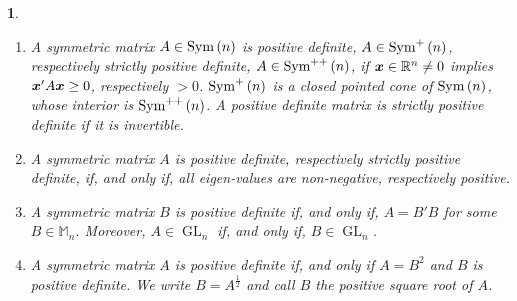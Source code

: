\documentclass[12pt,a4paper]{amsart}
\theoremstyle{plain}%
\newtheorem{npar}{}%
\theoremstyle{definition}
\theoremstyle{remark}
\begin{document}
\begin{npar}
\begin{enumerate}
  \item A symmetric matrix $A \in \operatorname{Sym}\left(n\right)$ is positive definite, $A \in \operatorname{Sym}^{+}\left(n\right)$, respectively strictly positive definite, $A \in \operatorname{Sym}^{++}\left(n\right)$, if $\bm x \in \mathbb{R}^n \ne 0$ implies $\bm x' A \bm x \ge 0$, respectively $>0$. $\operatorname{Sym}^{+}\left(n\right)$ is a closed pointed cone of $\operatorname{Sym}\left(n\right)$, whose interior is $\operatorname{Sym}^{++}\left(n\right)$. A positive definite matrix is strictly positive definite if it is invertible.
\item A symmetric matrix $A$ is positive definite, respectively strictly positive definite,  if, and only if, all eigen-values are non-negative, respectively positive.
\item A symmetric matrix $B$ is positive definite if, and only if, $A = B'B$ for some $B \in \mathbb M_n$. Moreover, $A\in \operatorname{GL}_n$ if, and only if, $B\in \operatorname{GL}_n$.
\item A symmetric matrix $A$ is positive definite if, and only if $A=B^2$ and $B$ is positive definite. We write $B = A^{\frac12}$ and call $B$ the \emph{positive square root} of $A$.
  \end{enumerate}
\end{npar}
\end{document}
